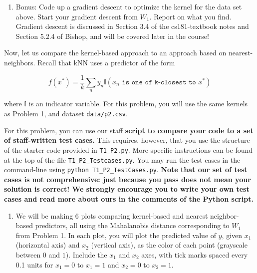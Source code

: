 \documentclass[submit]{harvardml}
\begin{document}
\begin{framed}
\begin{enumerate}
\item Bonus:  Code up a gradient descent to
  optimize the kernel for the data set above.  Start your gradient
  descent from $W_1$.  Report on what you find.\\
  Gradient descent is discussed in Section 3.4 of the cs181-textbook notes and Section 5.2.4 of Bishop, and will be covered later in the course! 

\end{enumerate}
  
\end{framed}  


\newpage



\begin{problem}

Now, let us compare the kernel-based approach to an approach based on
nearest-neighbors.  Recall that kNN uses a predictor of the form

  \begin{equation*}
    f(x^*) = \frac{1}{k} \sum_n y_n \mathbb{I}(x_n \texttt{ is one of k-closest to } x^*)
  \end{equation*}

\noindent where $\mathbb{I}$ is an indicator variable. For this problem, you will use the same kernels as Problem 1, and dataset \verb|data/p2.csv|. 

For this problem, you can use our staff \textbf{script to compare your code to a set of staff-written test cases.} This requires, however, that you use the structure of the starter code provided in \texttt{T1\_P2.py}. More specific instructions can be found at the top of the file \texttt{T1\_P2\_Testcases.py}. You may run the test cases in the command-line using \texttt{python T1\_P2\_TestCases.py}.
\textbf{Note that our set of test cases is not comprehensive: just because you pass does not mean your solution is correct! We strongly encourage you to write your own test cases and read more about ours in the comments of the Python script.}


\begin{enumerate}

\item We will be making 6 plots comparing kernel-based and nearest
  neighbor-based predictors, all using the Mahalanobis distance
  corresponding to $W_1$ from Problem 1. In each plot, you will plot
  the predicted value of $y$, given $x_1$ (horizontal axis) and $x_2$
  (vertical axis), as the color of each point (grayscale
  between $0$ and $1$). Include the $x_1$ and $x_2$ axes, with tick marks spaced every 0.1 units
  for $x_1=0$ to $x_1=1$ and $x_2=0$ to $x_2=1$.
  

\end{enumerate}
\end{problem}
\end{document}

